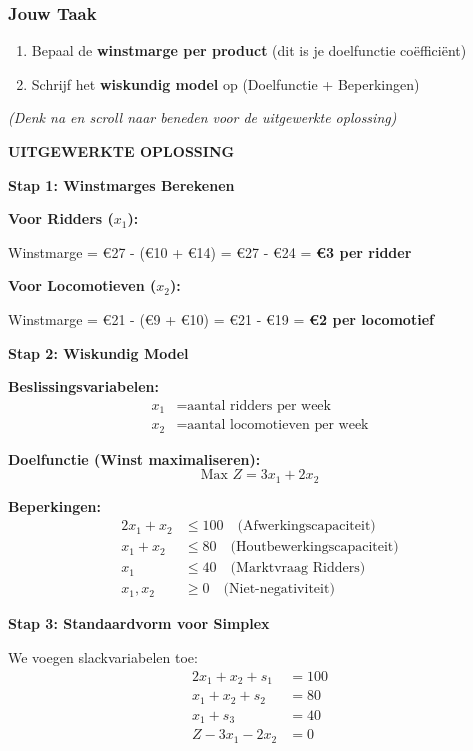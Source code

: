 \documentclass[a4paper,11pt]{article}
\begin{document}
\begin{oefenblok}[title=Lineair Programmeren — De Ambachtelijke Werkplaats]
\subsubsection*{Jouw Taak}

\begin{enumerate}
    \item Bepaal de \textbf{winstmarge per product} (dit is je doelfunctie coëfficiënt)
    \item Schrijf het \textbf{wiskundig model} op (Doelfunctie + Beperkingen)
\end{enumerate}

\vspace{0.3cm}
\textit{(Denk na en scroll naar beneden voor de uitgewerkte oplossing)}



\textbf{UITGEWERKTE OPLOSSING}

\textbf{Stap 1: Winstmarges Berekenen}

\textbf{Voor Ridders ($x_1$):}

Winstmarge = €27 - (€10 + €14) = €27 - €24 = \textbf{€3 per ridder}

\textbf{Voor Locomotieven ($x_2$):}

Winstmarge = €21 - (€9 + €10) = €21 - €19 = \textbf{€2 per locomotief}

\textbf{Stap 2: Wiskundig Model}

\textbf{Beslissingsvariabelen:}
\begin{align*}
x_1 &= \text{aantal ridders per week} \\
x_2 &= \text{aantal locomotieven per week}
\end{align*}

\textbf{Doelfunctie (Winst maximaliseren):}
\[
\text{Max } Z = 3x_1 + 2x_2
\]

\textbf{Beperkingen:}
\begin{align}
2x_1 + x_2 &\leq 100 \quad \text{(Afwerkingscapaciteit)} \\
x_1 + x_2 &\leq 80 \quad \text{(Houtbewerkingscapaciteit)} \\
x_1 &\leq 40 \quad \text{(Marktvraag Ridders)} \\
x_1, x_2 &\geq 0 \quad \text{(Niet-negativiteit)}
\end{align}

\textbf{Stap 3: Standaardvorm voor Simplex}

We voegen slackvariabelen toe:
\begin{align*}
2x_1 + x_2 + s_1 &= 100 \\
x_1 + x_2 + s_2 &= 80 \\
x_1 + s_3 &= 40 \\
Z - 3x_1 - 2x_2 &= 0
\end{align*}


\end{oefenblok}
\end{document}
